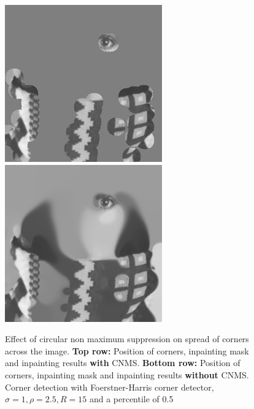 \begin{figure}
    \includegraphics[width=0.31\linewidth]{../Images/trui/trui-mask_non_cnms.png}
    \includegraphics[width=0.31\linewidth]{../Images/trui/trui-inpaint_non_cnms.png}
    \caption{Effect of circular non maximum suppression on spread of corners across the image.
        \textbf{Top row:} Position of corners, inpainting mask and inpainting results
        \textbf{with} CNMS\@.
\textbf{Bottom row:} Position of corners, inpainting mask and inpainting results \textbf{without}
CNMS\@.
    Corner detection with Foerstner-Harris corner detector, $\sigma=1,\rho=2.5,R=15$ and a
percentile of 0.5}\label{fig:CNMSExample}
\end{figure}
